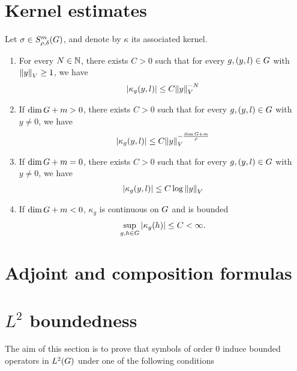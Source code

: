 \section{Kernel estimates}

\begin{theorem}
\label{theorem:kernel_estimates}
    Let $\sigma \in S^{m}_{\rho, \delta}(G)$, and denote by $\kappa$ its associated kernel.
    \begin{enumerate}
        \item For every $N \in \mathbb{N}$, there exists $C > 0$ such that for every $g, (y, l) \in G$ with ${\left\| y \right\|}_{V} \geq 1$, we have
            \begin{align*}
                \left|{\kappa_g(y, l)}\right| \leq C {\left\| y \right\|}_{V}^{-N}
            \end{align*}
        \item If $\dim G + m > 0$, there exists $C > 0$ such that for every $g, (y, l) \in G$ with $y \neq 0$, we have
            \begin{align*}
                \left|{\kappa_g(y, l)}\right| \leq C {\left\| y \right\|}_{V}^{- \frac{\dim G + m}{\rho}}
            \end{align*}
        \item If $\dim G + m = 0$, there exists $C > 0$ such that for every $g, (y, l) \in G$ with $y \neq 0$, we have
            \begin{align*}
                \left|{\kappa_g(y, l)}\right| \leq C \log {\left\| y \right\|}_{V}
            \end{align*}
        \item If $\dim G + m < 0$, $\kappa_g$ is continuous on $G$ and is bounded
            \begin{align*}
                \sup_{g, h \in G} \left|{\kappa_g(h)}\right| \leq C < \infty.
            \end{align*}
    \end{enumerate}
\end{theorem}

\section{Adjoint and composition formulas}

\section{\texorpdfstring{$L^2$}{L2} boundedness}

The aim of this section is to prove
that symbols of order $0$ induce bounded operators in ${L^{2} (G)}$
under one of the following conditions

